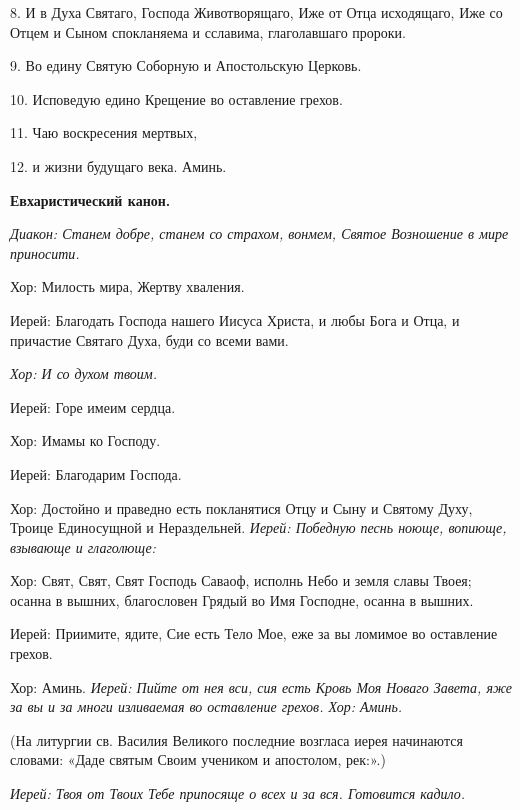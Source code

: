   8. И в Духа Святаго, Господа Животворящаго, Иже от Отца исходящаго, Иже со Отцем и Сыном спокланяема и сславима, глаголавшаго пророки.


  9. Во едину Святую Соборную и Апостольскую Церковь.


  10. Исповедую едино Крещение во оставление грехов.


  11. Чаю воскресения мертвых,


  12. и жизни будущаго века. Аминь. 


\medskip\bfseries  Евхаристический канон. \normalfont{}\nopagebreak


\itshape  Диакон:\normalfont{} Станем добре, станем со страхом, вонмем, Святое Возношение в мире приносити\itshape . 


  Хор:\normalfont{} Милость мира, Жертву хваления. \itshape 


  Иерей:\normalfont{} Благодать Господа нашего Иисуса Христа, и любы Бога и Отца, и причастие Святаго Духа, буди со всеми вами.


\itshape Хор:\normalfont{} И со духом твоим. \itshape 


  Иерей:\normalfont{} Горе имеим сердца. \itshape 


  Хор:\normalfont{} Имамы ко Господу. \itshape 


  Иерей:\normalfont{} Благодарим Господа. \itshape 


  Хор:\normalfont{} Достойно и праведно есть покланятися Отцу и Сыну и Святому Духу, Троице Единосущной и Нераздельней. \itshape  Иерей:\normalfont{} Победную песнь ноюще, вопиюще, взывающе и глаголюще: \itshape 


  Хор:\normalfont{} Свят, Свят, Свят Господь Саваоф, исполнь Небо и земля славы Твоея; осанна в вышних, благословен Грядый во Имя Господне, осанна в вышних. \itshape 


  Иерей:\normalfont{} Приимите, ядите, Сие есть Тело Мое, еже за вы ломимое во оставление грехов. \itshape 


  Хор:\normalfont{} Аминь. \itshape  Иерей:\normalfont{} Пийте от нея вси, сия есть Кровь Моя Новаго Завета, яже за вы и за многи изливаемая во оставление грехов. \itshape  Хор:\normalfont{} Аминь. 


  (На литургии св. Василия Великого последние возгласа иерея начинаются словами: «Даде святым Своим учеником и апостолом, рек:».)


\itshape  Иерей:\normalfont{} Твоя от Твоих Тебе припосяще о всех и за вся. \itshape  Готовится кадило\normalfont{}. \itshape 


